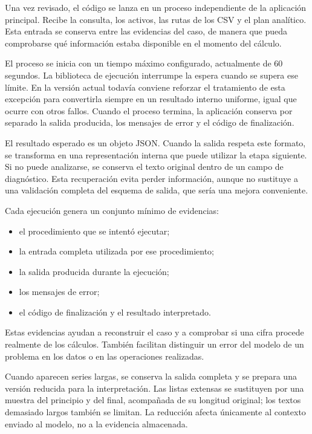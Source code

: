 Una vez revisado, el código se lanza en un proceso independiente de la aplicación principal. Recibe la consulta, los activos, las rutas de los CSV y el plan analítico. Esta entrada se conserva entre las evidencias del caso, de manera que pueda comprobarse qué información estaba disponible en el momento del cálculo.

El proceso se inicia con un tiempo máximo configurado, actualmente de 60 segundos. La biblioteca de ejecución interrumpe la espera cuando se supera ese límite. En la versión actual todavía conviene reforzar el tratamiento de esta excepción para convertirla siempre en un resultado interno uniforme, igual que ocurre con otros fallos. Cuando el proceso termina, la aplicación conserva por separado la salida producida, los mensajes de error y el código de finalización.

El resultado esperado es un objeto JSON. Cuando la salida respeta este formato, se transforma en una representación interna que puede utilizar la etapa siguiente. Si no puede analizarse, se conserva el texto original dentro de un campo de diagnóstico. Esta recuperación evita perder información, aunque no sustituye a una validación completa del esquema de salida, que sería una mejora conveniente.

Cada ejecución genera un conjunto mínimo de evidencias:

\begin{itemize}
    \item el procedimiento que se intentó ejecutar;
    \item la entrada completa utilizada por ese procedimiento;
    \item la salida producida durante la ejecución;
    \item los mensajes de error;
    \item el código de finalización y el resultado interpretado.
\end{itemize}

Estas evidencias ayudan a reconstruir el caso y a comprobar si una cifra procede realmente de los cálculos. También facilitan distinguir un error del modelo de un problema en los datos o en las operaciones realizadas.

Cuando aparecen series largas, se conserva la salida completa y se prepara una versión reducida para la interpretación. Las listas extensas se sustituyen por una muestra del principio y del final, acompañada de su longitud original; los textos demasiado largos también se limitan. La reducción afecta únicamente al contexto enviado al modelo, no a la evidencia almacenada.


